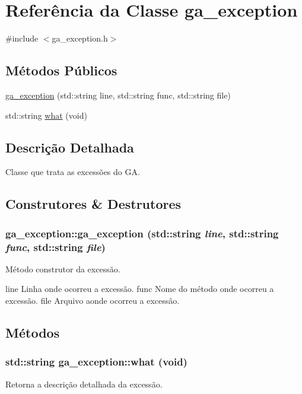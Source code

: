 \hypertarget{classga__exception}{
\section{Referência da Classe ga\_\-exception}
\label{classga__exception}
}


{\ttfamily \#include $<$ga\_\-exception.h$>$}

\subsection*{Métodos Públicos}
\begin{DoxyCompactItemize}
\item 
\hyperlink{classga__exception_a92dc4bfb0206de9f8a107f2545eb3bb8}{ga\_\-exception} (std::string line, std::string func, std::string file)
\item 
std::string \hyperlink{classga__exception_ab636963c37205d48c5b8f00ef353bed0}{what} (void)
\end{DoxyCompactItemize}


\subsection{Descrição Detalhada}
Classe que trata as excessões do GA. 

\subsection{Construtores \& Destrutores}
\hypertarget{classga__exception_a92dc4bfb0206de9f8a107f2545eb3bb8}{
\subsubsection[{ga\_\-exception}]{\setlength{\rightskip}{0pt plus 5cm}ga\_\-exception::ga\_\-exception (std::string {\em line}, \/  std::string {\em func}, \/  std::string {\em file})}}
\label{classga__exception_a92dc4bfb0206de9f8a107f2545eb3bb8}
Método construtor da excessão.

line Linha onde ocorreu a excessão.  func Nome do método onde ocorreu a excessão.  file Arquivo aonde ocorreu a excessão. 

\subsection{Métodos}
\hypertarget{classga__exception_ab636963c37205d48c5b8f00ef353bed0}{
\subsubsection[{what}]{\setlength{\rightskip}{0pt plus 5cm}std::string ga\_\-exception::what (void)}}
\label{classga__exception_ab636963c37205d48c5b8f00ef353bed0}
Retorna a descrição detalhada da excessão.

